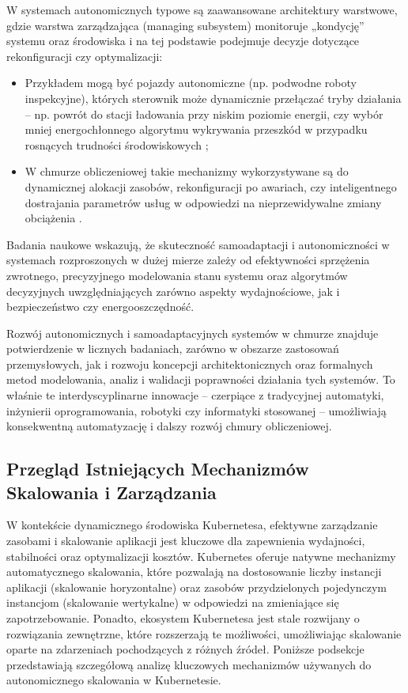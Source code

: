 W systemach autonomicznych typowe są zaawansowane architektury warstwowe, gdzie warstwa zarządzająca (managing subsystem) monitoruje „kondycję” systemu oraz środowiska i na tej podstawie podejmuje decyzje dotyczące rekonfiguracji czy optymalizacji:

\begin{itemize}
    \item Przykładem mogą być pojazdy autonomiczne (np. podwodne roboty inspekcyjne), których sterownik może dynamicznie przełączać tryby działania – np. powrót do stacji ładowania przy niskim poziomie energii, czy wybór mniej energochłonnego algorytmu wykrywania przeszkód w przypadku rosnących trudności środowiskowych ;
    \item W chmurze obliczeniowej takie mechanizmy wykorzystywane są do dynamicznej alokacji zasobów, rekonfiguracji po awariach, czy inteligentnego dostrajania parametrów usług w odpowiedzi na nieprzewidywalne zmiany obciążenia .
\end{itemize}

Badania naukowe wskazują, że skuteczność samoadaptacji i autonomiczności w systemach rozproszonych w dużej mierze zależy od efektywności sprzężenia zwrotnego, precyzyjnego modelowania stanu systemu oraz algorytmów decyzyjnych uwzględniających zarówno aspekty wydajnościowe, jak i bezpieczeństwo czy energooszczędność.

Rozwój autonomicznych i samoadaptacyjnych systemów w chmurze znajduje potwierdzenie w licznych badaniach, zarówno w obszarze zastosowań przemysłowych, jak i rozwoju koncepcji architektonicznych oraz formalnych metod modelowania, analiz i walidacji poprawności działania tych systemów. To właśnie te interdyscyplinarne innowacje – czerpiące z tradycyjnej automatyki, inżynierii oprogramowania, robotyki czy informatyki stosowanej – umożliwiają konsekwentną automatyzację i dalszy rozwój chmury obliczeniowej.














\subsection{Przegląd Istniejących Mechanizmów Skalowania i Zarządzania}
W kontekście dynamicznego środowiska Kubernetesa, efektywne zarządzanie zasobami i skalowanie aplikacji jest kluczowe dla zapewnienia wydajności, stabilności oraz optymalizacji kosztów. Kubernetes oferuje natywne mechanizmy automatycznego skalowania, które pozwalają na dostosowanie liczby instancji aplikacji (skalowanie horyzontalne) oraz zasobów przydzielonych pojedynczym instancjom (skalowanie wertykalne) w odpowiedzi na zmieniające się zapotrzebowanie. Ponadto, ekosystem Kubernetesa jest stale rozwijany o rozwiązania zewnętrzne, które rozszerzają te możliwości, umożliwiając skalowanie oparte na zdarzeniach pochodzących z różnych źródeł. Poniższe podsekcje przedstawiają szczegółową analizę kluczowych mechanizmów używanych do autonomicznego skalowania w Kubernetesie.

